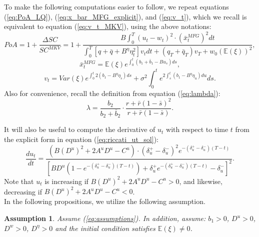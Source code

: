 \documentclass[11pt]{article}
\newtheorem{assumption}{Assumption}
\begin{document}
To make the following computations easier to follow, we repeat equations (\ref{eq:PoA_LQ}), (\ref{eq:x_bar_MFG_explicit}), and (\ref{eq:v_t}), which we recall is equivalent to  equation (\ref{eq:v_t_MKV}), using the above notations:
\begin{equation}
PoA =1+ \frac{\Delta SC}{SC^{MKV}}= 1 +  \frac{ \displaystyle B\int_0^T (u_t-w_t)^2 \cdot (\bar{x}_t^{MFG})^2 dt }{\displaystyle \int_0^T \left[q+\bar{q} + B^{\eta} \eta_t^2 \right] v_t dt + (q_T + \bar{q}_T) v_T + w_0 (\mathbb{E}(\xi))^2},
\label{eq:PoA_LQ_new_notation}
\end{equation}
\begin{equation}
\bar{x}^{MFG}_t=\mathbb{E}(\xi) e^{\int_0^t(b_1+\bar{b}_1-Bu_s)ds},
\label{eq:x_bar_MFG_explicit_new_notation}
\end{equation}
\begin{equation}
v_t=Var(\xi)e^{\int_0^t 2(b_1-B^{\eta} \eta_s)ds}+\sigma^2 \int_0^t e^{2 \int_s^t (b_1-B^{\eta}\eta_u) du}ds.
\label{eq:v_t_new_notation}
\end{equation}
Also for convenience, recall the definition from equation (\ref{eq:lambda}):
\begin{equation*}
\lambda = \frac{b_2}{b_2 + \bar{b}_2}\cdot \frac{ r + \bar{r}(1-\bar{s})^2 }{r + \bar{r}(1-\bar{s})}.
\end{equation*}

It will also be useful to compute the derivative of $u_t$ with respect to time $t$ from the explicit form in equation (\ref{eq:riccati_ut_sol}):
\begin{equation}
\frac{d u_t}{dt} = \frac{\left(B (D^{u})^2 + 2 A^u D^{u} - C^{u} \right) \cdot \left(\delta_u^{+} - \delta_u^{-}\right)^2 e^{- (\delta_u^{+} - \delta_u^{-})(T-t) } }{\left[B D^{u}(1-e^{- (\delta_u^{+} - \delta_u^{-})(T-t)})   + \delta_u^{+}e^{- (\delta_u^{+} - \delta_u^{-})(T-t)}- \delta_u^{-}  \right]^2 }.
\label{eq:riccati_ut_sol_deriv}
\end{equation}
Note that $u_t$ is increasing if $B (D^{u})^2 + 2 A^u D^{u} - C^{u}>0$, and likewise, decreasing if $B (D^{u})^2 + 2 A^u D^{u} - C^{u}<0$.\\

In the following propositions, we utilize the following assumption.	
\begin{assumption}\label{assumption}
	Assume (\ref{eq:assumptions}). In addition, assume: $b_1 > 0$, $D^{u} > 0$, $D^w > 0$, $D^{\eta} >0$ and the initial condition satisfies $\mathbb{E}(\xi) \neq 0$.
\end{assumption}
\end{document}
